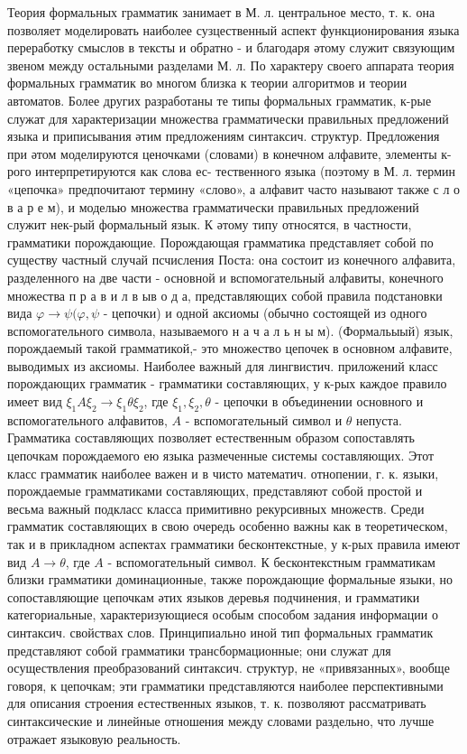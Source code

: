 \documentclass[10pt]{article}
\begin{document}
Теория формальных грамматик занимает в М. л. центральное место, т. к. она позволяет моделировать наиболее сузцественный аспект функционирования языка переработку смыслов в тексты и обратно - и благодаря әтому служит связующим звеном между остальными разделами М. л. По характеру своего аппарата теория формальных грамматик во многом близка к теории алгоритмов и теории автоматов. Более других разработаны те типы формальных грамматик, к-рые служат для характеризации множества грамматически правильных предложений языка и приписывания әтим предложениям синтаксич. структур. Предложения при әтом моделируются ценочками (словами) в конечном алфавите, элементы к-рого интерпретируются как слова ес- тественного языка (поэтому в М. л. термин «цепочка» предпочитают термину «слово», а алфавит часто называют также с л о в а р е м), и моделью множества грамматически правильных предложений служит нек-рый формальный язык. К әтому типу относятся, в частности, грамматики порождающие. Порождающая грамматика представляет собой по существу частный случай псчисления Поста: она состоит из конечного алфавита, разделенного на две части - основной и вспомогательный алфавиты, конечного множества п р а в и л в ыв о д а, представляющих собой правила подстановки вида $\varphi \rightarrow \psi(\varphi, \psi$ - цепочки) и одной аксиомы (обычно состоящей из одного вспомогательного символа, называемого н а ч а л ь н ы м). (Формальыый) язык, порождаемый такой грамматикой,- это множество цепочек в основном алфавите, выводимых из аксиомы. Наиболее важный для лингвистич. приложений класс порождающих грамматик - грамматики составляющих, у к-рых каждое правило имеет вид $\xi_{1} A \xi_{2} \rightarrow \xi_{1} \theta \xi_{2}$, где $\xi_{1}, \xi_{2}, \theta$ - цепочки в объединении основного и вспомогательного алфавитов, $A$ - вспомогательный символ и $\theta$ непуста. Грамматика составляющих позволяет естественным образом сопоставлять цепочкам порождаемого ею языка размеченные системы составляющих. Этот класс грамматик наиболее важен и в чисто математич. отнопении, г. к. языки, порождаемые грамматиками составляющих, представляют собой простой и весьма важный подкласс класса примитивно рекурсивных множеств. Среди грамматик составляющих в свою очередь особенно важны как в теоретическом, так и в прикладном аспектах грамматики бесконтекстные, у к-рых правила имеют вид $A \rightarrow \theta$, где $A$ - вспомогательный символ. К бесконтекстным грамматикам близки грамматики доминационные, также порождающие формальные языки, но сопоставляющие цепочкам әтих языков деревья подчинения, и грамматики категориальные, характеризующиеся особым способом задания информации о синтаксич. свойствах слов. Принципиально иной тип формальных грамматик представляют собой грамматики трансбормационные; они служат для осуществления преобразований синтаксич. структур, не «привязанных», вообще говоря, к цепочкам; эти грамматики представляются наиболее перспективными для описания строения естественных языков, т. к. позволяют рассматривать синтаксические и линейные отношения между словами раздельно, что лучше отражает языковую реальность.
\end{document}
